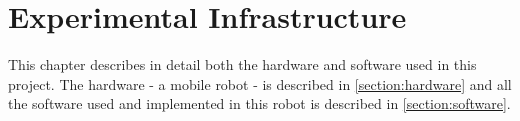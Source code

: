 \chapter{Experimental Infrastructure}

This chapter describes in detail both the hardware and software used in this project. The hardware - a mobile robot - is described in \cref{section:hardware} and all the software used and implemented in this robot is described in \cref{section:software}.




